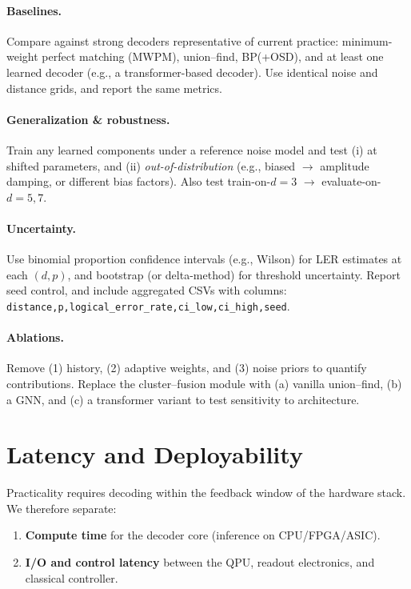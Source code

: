 \documentclass[conference]{IEEEtran}
\begin{document}
    \paragraph{Baselines.} Compare against strong decoders representative of current practice: minimum-weight perfect 
matching (MWPM), union–find, BP(+OSD), and at least one learned decoder (e.g., a transformer-based decoder). Use 
identical noise and distance grids, and report the same metrics.

    \paragraph{Generalization \& robustness.} Train any learned components under a reference noise model and test (i) at 
shifted parameters, and (ii) \emph{out-of-distribution} (e.g., biased $\rightarrow$ amplitude damping, or different bias 
factors). Also test train-on-$d{=}3$ $\rightarrow$ evaluate-on-$d{=}5,7$.

    \paragraph{Uncertainty.} Use binomial proportion confidence intervals (e.g., Wilson) for LER estimates at each 
$(d,p)$, and bootstrap (or delta-method) for threshold uncertainty. Report seed control, and include aggregated CSVs with 
columns: \texttt{distance,p,logical\_error\_rate,ci\_low,ci\_high,seed}.

    \paragraph{Ablations.} Remove (1) history, (2) adaptive weights, and (3) noise priors to quantify contributions. 
Replace the cluster–fusion module with (a) vanilla union–find, (b) a GNN, and (c) a transformer variant to test 
sensitivity to architecture.

    \clearpage
    \section{Latency and Deployability}
    \label{sec:latency}
    \noindent Practicality requires decoding within the feedback window of the hardware stack. We therefore separate:
    \begin{enumerate}
      \item \textbf{Compute time} for the decoder core (inference on CPU/FPGA/ASIC).
      \item \textbf{I/O and control latency} between the QPU, readout electronics, and classical controller.
    \end{enumerate}
\end{document}
